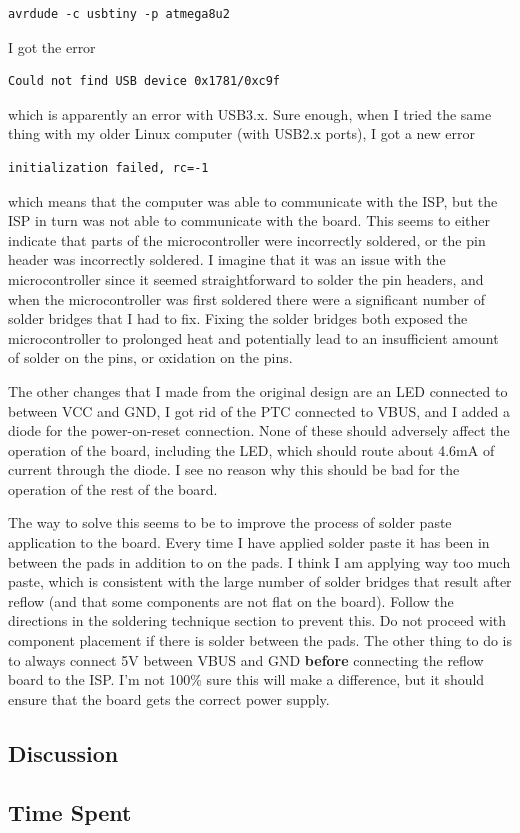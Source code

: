 \documentclass[11pt,twoside,a4paper]{report}
\begin{document}
\begin{lstlisting}[mathescape]
avrdude -c usbtiny -p atmega8u2
\end{lstlisting}

I got the error

\begin{lstlisting}[mathescape]
Could not find USB device 0x1781/0xc9f
\end{lstlisting}

which is apparently an error with USB3.x. Sure enough, when I tried the same thing with my older
Linux computer (with USB2.x ports), I got a new error

\begin{lstlisting}[mathescape]
initialization failed, rc=-1
\end{lstlisting}

which means that the computer was able to communicate with the ISP, but the ISP in turn was not able
to communicate with the board. This seems to either indicate that parts of the microcontroller were
incorrectly soldered, or the pin header was incorrectly soldered. I imagine that it was an issue
with the microcontroller since it seemed straightforward to solder the pin headers, and when the
microcontroller was first soldered there were a significant number of solder bridges that I had to
fix. Fixing the solder bridges both exposed the microcontroller to prolonged heat and potentially
lead to an insufficient amount of solder on the pins, or oxidation on the pins.\newline

The other changes that I made from the original design are an LED connected to between VCC and GND,
I got rid of the PTC connected to VBUS, and I added a diode for the power-on-reset connection. None
of these should adversely affect the operation of the board, including the LED, which should route
about 4.6mA of current through the diode. I see no reason why this should be bad for the operation
of the rest of the board.\newline

The way to solve this seems to be to improve the process of solder paste application to the
board. Every time I have applied solder paste it has been in between the pads in addition to on the
pads. I think I am applying way too much paste, which is consistent with the large number of solder
bridges that result after reflow (and that some components are not flat on the board). Follow the
directions in the soldering technique section to prevent this. Do not proceed with component
placement if there is solder between the pads. The other thing to do is to always connect 5V between
VBUS and GND \textbf{before} connecting the reflow board to the ISP. I'm not 100\% sure this will
make a difference, but it should ensure that the board gets the correct power supply.


\subsection{Discussion}

\subsection{Time Spent}
\end{document}
